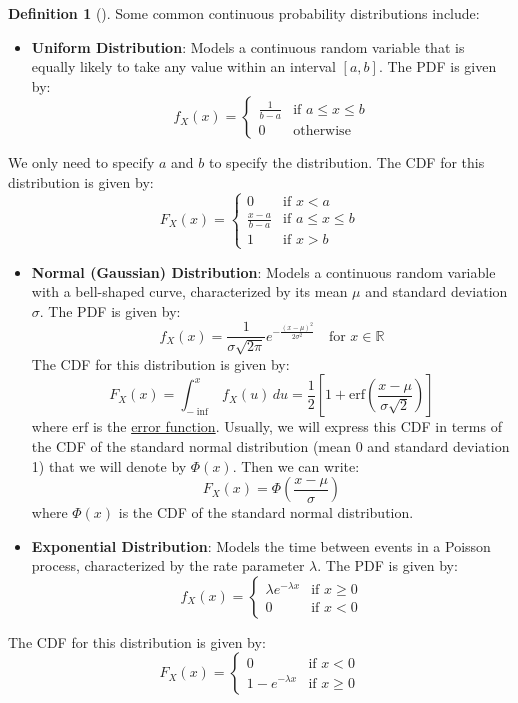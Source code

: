 \documentclass[
  letterpaper,
  DIV=11,
  numbers=noendperiod]{scrreport}
\providecommand{\tightlist}{%
  \setlength{\itemsep}{0pt}\setlength{\parskip}{0pt}}
\theoremstyle{definition}
\theoremstyle{plain}
\theoremstyle{definition}
\newtheorem{definition}{Definition}[chapter]
\theoremstyle{plain}
\theoremstyle{remark}
\begin{document}
\begin{tcolorbox}
\begin{definition}[]
Some common continuous probability distributions include:

\begin{itemize}
\tightlist
\item
  \textbf{Uniform Distribution}: Models a continuous random variable
  that is equally likely to take any value within an interval
  \([a, b]\). The PDF is given by: \[
  f_X(x) =
  \begin{cases}
  \frac{1}{b - a} & \text{if } a \le x \le b \\
  0 & \text{otherwise}
  \end{cases}
  \]
\end{itemize}

We only need to specify \(a\) and \(b\) to specify the distribution. The
CDF for this distribution is given by: \[
F_X(x) =
\begin{cases}
0 & \text{if } x < a \\
\frac{x - a}{b - a} & \text{if } a \le x \le b \\
1 & \text{if } x > b
\end{cases}
\]

\begin{itemize}
\item
  \textbf{Normal (Gaussian) Distribution}: Models a continuous random
  variable with a bell-shaped curve, characterized by its mean \(\mu\)
  and standard deviation \(\sigma\). The PDF is given by: \[
  f_X(x) = \frac{1}{\sigma \sqrt{2\pi}} e^{-\frac{(x - \mu)^2}{2\sigma^2}} \quad \text{for } x \in \mathbb{R}
  \] The CDF for this distribution is given by: \[
  F_X(x) = \int_{-\inf}^x f_X(u)\,du = \frac{1}{2} \left[ 1 + \text{erf}\left( \frac{x - \mu}{\sigma \sqrt{2}} \right) \right]
  \] where \(\text{erf}\) is the
  \href{https://en.wikipedia.org/wiki/Error_function}{error function}.
  Usually, we will express this CDF in terms of the CDF of the standard
  normal distribution (mean 0 and standard deviation 1) that we will
  denote by \(\Phi(x)\). Then we can write: \[
  F_X(x) = \Phi\left( \frac{x - \mu}{\sigma} \right)
  \] where \(\Phi(x)\) is the CDF of the standard normal distribution.
\item
  \textbf{Exponential Distribution}: Models the time between events in a
  Poisson process, characterized by the rate parameter \(\lambda\). The
  PDF is given by: \[
  f_X(x) =
  \begin{cases}
  \lambda e^{-\lambda x} & \text{if } x \ge 0 \\
  0 & \text{if } x < 0
  \end{cases}
  \]
\end{itemize}

The CDF for this distribution is given by: \[
F_X(x) =
\begin{cases}
0 & \text{if } x < 0 \\
1 - e^{-\lambda x} & \text{if } x \ge 0
\end{cases}
\]

\end{definition}

\end{tcolorbox}
\end{document}
